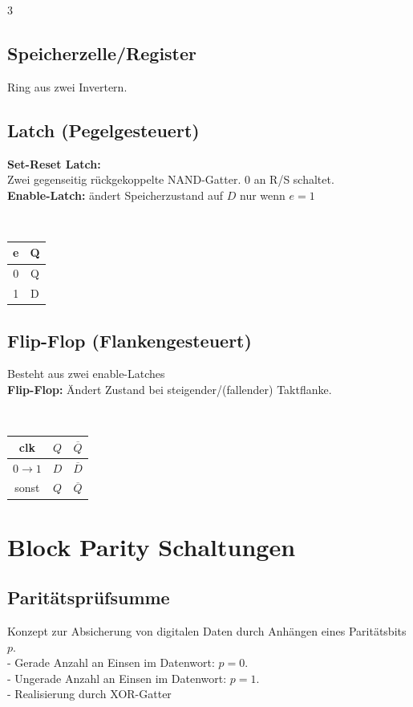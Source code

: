 \documentclass[6pt,a4paper]{scrartcl}
\renewcommand{\emph}[1]{\textsf{\textbf{#1}}}
\newcommand{\ol}[1]{\ensuremath{\overline{#1}}}									%
\newcommand{\ra}[0]{\ensuremath{\rightarrow}} 									%
\begin{document}
\begin{multicols*}{3}

	\subsection{Speicherzelle/Register}
	Ring aus zwei Invertern.

	\subsection{Latch (Pegelgesteuert)}
	\parbox{5cm}{
		\emph{Set-Reset Latch:} \\ Zwei gegenseitig rückgekoppelte NAND-Gatter. $0$ an R/S schaltet.
		\\	\emph{Enable-Latch:} ändert Speicherzustand auf $D$ nur wenn $e=1$
	}
	\parbox{.5cm}{\ }
	\parbox{2cm}{
		\begin{tabular}{c|c} e & Q \\ \hline 0 & Q \\ 1 & D \end{tabular}
	}


	\subsection{Flip-Flop (Flankengesteuert)}
	\parbox{5cm}{
		Besteht aus zwei enable-Latches \\
		\emph{Flip-Flop:} Ändert Zustand bei steigender/(fallender) Taktflanke.\\
	}
	\parbox{.5cm}{\ }
	\parbox{2cm}{
		\begin{tabular}{c|c|c} clk & $Q$ & $\ol Q$ \\ \hline $0 \ra 1$ & $D$ & $\ol D$ \\ sonst & $Q$ & $\ol Q$ \end{tabular}
	}

	\section{Block Parity Schaltungen}
	\subsection{Paritätsprüfsumme}
	Konzept zur Absicherung von digitalen Daten durch Anhängen eines Paritätsbits $p$.\\
	- Gerade Anzahl an Einsen im Datenwort: $p = 0$.\\
	- Ungerade Anzahl an Einsen im Datenwort: $p = 1$.\\
	- Realisierung durch XOR-Gatter

\end{multicols*}
\end{document}
